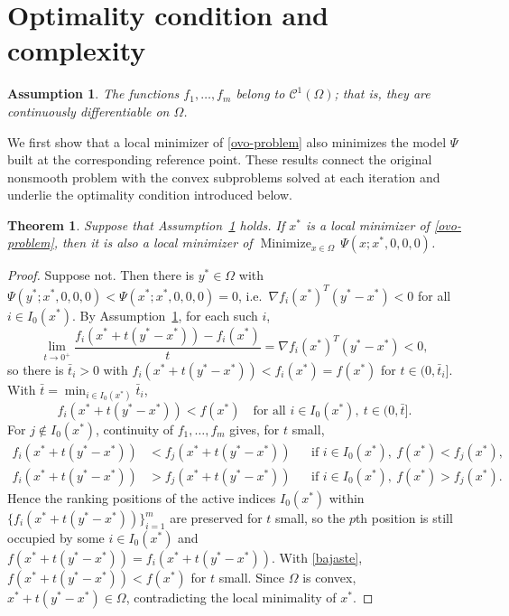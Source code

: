 \documentclass[11pt]{article}
\newcommand{\minimize}{\mathop{\text{Minimize}}}
\newtheorem{theorem}{Theorem}[section]
\newtheorem{assumption}{Assumption}
\begin{document}
\section{Optimality condition and complexity} \label{sec:complexity}

\begin{assumption} \label{a1}
The functions $f_1, \ldots, f_m$ belong to $\mathcal{C}^1(\Omega)$; that is,
they are continuously differentiable on $\Omega$.
\end{assumption}

We first show that a local minimizer of \eqref{ovo-problem} also minimizes the
model $\Psi$ built at the corresponding reference point. These results connect
the original nonsmooth problem with the convex subproblems solved at each
iteration and underlie the optimality condition introduced below.

\begin{theorem} \label{teo:conv1}
Suppose that Assumption~\ref{a1} holds. If $x^*$ is a local minimizer of
\eqref{ovo-problem}, then it is also a local minimizer of
$\minimize_{x \in \Omega}\, \Psi(x; x^*, 0, 0, 0)$.
\end{theorem}

\begin{proof}
Suppose not. Then there is $y^* \in \Omega$ with
$\Psi(y^*; x^*, 0, 0, 0) < \Psi(x^*; x^*, 0, 0, 0) = 0$, i.e.\
$\nabla f_i(x^*)^T(y^* - x^*) < 0$ for all $i \in I_0(x^*)$. By
Assumption~\ref{a1}, for each such $i$,
\[
\lim_{t \to 0^+} \frac{f_i(x^* + t(y^* - x^*)) - f_i(x^*)}{t}
= \nabla f_i(x^*)^T(y^* - x^*) < 0,
\]
so there is $\bar{t}_i > 0$ with $f_i(x^* + t(y^* - x^*)) < f_i(x^*) = f(x^*)$
for $t \in (0, \bar{t}_i]$. With $\bar{t} = \min_{i \in I_0(x^*)} \bar{t}_i$,
\begin{equation} \label{bajaste}
f_i(x^* + t(y^* - x^*)) < f(x^*) \quad
\text{for all } i \in I_0(x^*),\ t \in (0, \bar{t}].
\end{equation}
For $j \notin I_0(x^*)$, continuity of $f_1, \ldots, f_m$ gives, for $t$ small,
\begin{align}
f_i(x^* + t(y^* - x^*)) &< f_j(x^* + t(y^* - x^*))
&&\text{if } i \in I_0(x^*),\ f(x^*) < f_j(x^*), \label{arriba}\\
f_i(x^* + t(y^* - x^*)) &> f_j(x^* + t(y^* - x^*))
&&\text{if } i \in I_0(x^*),\ f(x^*) > f_j(x^*). \label{abajo}
\end{align}
Hence the ranking positions of the active indices $I_0(x^*)$ within
$\{f_i(x^* + t(y^* - x^*))\}_{i=1}^m$ are preserved for $t$ small, so the $p$th
position is still occupied by some $i \in I_0(x^*)$ and
$f(x^* + t(y^* - x^*)) = f_i(x^* + t(y^* - x^*))$. With \eqref{bajaste},
$f(x^* + t(y^* - x^*)) < f(x^*)$ for $t$ small. Since $\Omega$ is convex,
$x^* + t(y^* - x^*) \in \Omega$, contradicting the local minimality of $x^*$.
\end{proof}
\end{document}
